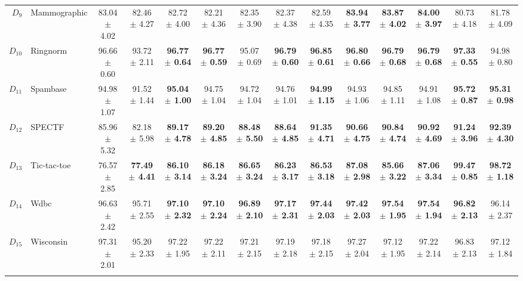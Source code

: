{\begin{landscape}
\begin{table}[!ht]
\begin{adjustbox}{width=1.5\textwidth,center=1.5\textwidth}
\begin{tabular}{rlcc|cccccccc|cc}
\rule{0pt}{17pt}$D_9$ & Mammographic & 83.04 $\pm$ 4.02 & 82.46 $\pm$ 4.27 & 82.72 $\pm$ 4.00 & 82.21 $\pm$ 4.36  & 82.35 $\pm$ 3.90 & 82.37 $\pm$ 4.38 & 82.59 $\pm$ 4.35 & \textbf{83.94 $\pm$ 3.77} & \textbf{83.87 $\pm$ 4.02} & \textbf{84.00 $\pm$ 3.97} & 80.73 $\pm$ 4.18  & 81.78 $\pm$ 4.09 \\  
\rule{0pt}{17pt}$D_{10}$ & Ringnorm & 96.66 $\pm$ 0.60  & 93.72 $\pm$ 2.11  & \textbf{96.77 $\pm$ 0.64} & \textbf{96.77 $\pm$ 0.59} & 95.07 $\pm$ 0.69 & \textbf{96.79 $\pm$ 0.60}  & \textbf{96.85 $\pm$ 0.61}  & \textbf{96.80 $\pm$ 0.66}  & \textbf{96.79 $\pm$ 0.68} & \textbf{96.79 $\pm$ 0.68}  & \textbf{97.33 $\pm$ 0.55}  & 94.98 $\pm$ 0.80 \\  
\rule{0pt}{17pt}$D_{11}$ & Spambase & 94.98 $\pm$ 1.07  & 91.52 $\pm$ 1.44 & \textbf{95.04 $\pm$ 1.00} & 94.75 $\pm$ 1.04 & 94.72 $\pm$ 1.04 & 94.76 $\pm$ 1.01 & \textbf{94.99 $\pm$ 1.15}  & 94.93 $\pm$ 1.06  & 94.85 $\pm$ 1.11 & 94.91 $\pm$ 1.08 & \textbf{95.72 $\pm$ 0.87}  & \textbf{95.31 $\pm$ 0.98} \\  
\rule{0pt}{17pt}$D_{12}$ & SPECTF & 85.96 $\pm$ 5.32 & 82.18 $\pm$ 5.98 & \textbf{89.17 $\pm$ 4.78} & \textbf{89.20 $\pm$ 4.85} & \textbf{88.48 $\pm$ 5.50} & \textbf{88.64 $\pm$ 4.85} & \textbf{91.35 $\pm$ 4.71} & \textbf{90.66 $\pm$ 4.75} & \textbf{90.84 $\pm$ 4.74} & \textbf{90.92 $\pm$ 4.69} & \textbf{91.24 $\pm$ 3.96} & \textbf{92.39 $\pm$ 4.30} \\  
\rule{0pt}{17pt}$D_{13}$ & Tic-tac-toe & 76.57 $\pm$ 2.85 & \textbf{77.49 $\pm$ 4.41} & \textbf{86.10 $\pm$ 3.14} & \textbf{86.18 $\pm$ 3.24}  & \textbf{86.65 $\pm$ 3.24} & \textbf{86.23 $\pm$ 3.17} & \textbf{86.53 $\pm$ 3.18} & \textbf{87.08 $\pm$ 2.98} & \textbf{85.66 $\pm$ 3.22}  & \textbf{87.06 $\pm$ 3.34}  & \textbf{99.47 $\pm$ 0.85} & \textbf{98.72 $\pm$ 1.18} \\  
\rule{0pt}{17pt}$D_{14}$ & Wdbc & 96.63 $\pm$ 2.42 & 95.71 $\pm$ 2.55 & \textbf{97.10 $\pm$ 2.32} & \textbf{97.10 $\pm$ 2.24} & \textbf{96.89 $\pm$ 2.10} & \textbf{97.17 $\pm$ 2.31} & \textbf{97.44 $\pm$ 2.03} &\textbf{ 97.42 $\pm$ 2.03} & \textbf{97.54 $\pm$ 1.95} & \textbf{97.54 $\pm$ 1.94} &\textbf{ 96.82 $\pm$ 2.13} & 96.14 $\pm$ 2.37 \\ 
\rule{0pt}{17pt}$D_{15}$ & Wisconsin & 97.31 $\pm$ 2.01 & 95.20 $\pm$ 2.33 & 97.22 $\pm$ 1.95 & 97.22 $\pm$ 2.11 & 97.21 $\pm$ 2.15 & 97.19 $\pm$ 2.18& 97.18 $\pm$ 2.15 & 97.27 $\pm$ 2.04 & 97.12 $\pm$ 1.95 & 97.22 $\pm$ 2.14 & 96.83 $\pm$ 2.13 & 97.12 $\pm$ 1.84 \\  
   \hline \\[-1em]

\end{tabular}
\end{adjustbox}
\end{table}
\end{landscape}}
